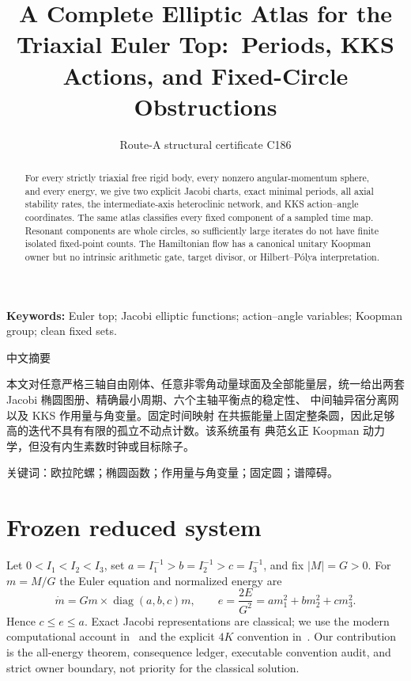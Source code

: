 \documentclass[8pt]{extarticle}
\title{A Complete Elliptic Atlas for the Triaxial Euler Top:\
Periods, KKS Actions, and Fixed-Circle Obstructions}
\author{Route-A structural certificate C186}
\date{}
\begin{document}
\maketitle
\begin{abstract}
For every strictly triaxial free rigid body, every nonzero angular-momentum
sphere, and every energy, we give two explicit Jacobi charts, exact minimal
periods, all axial stability rates, the intermediate-axis heteroclinic
network, and KKS action--angle coordinates.  The same atlas classifies every
fixed component of a sampled time map.  Resonant components are whole
circles, so sufficiently large iterates do not have finite isolated
fixed-point counts.  The Hamiltonian flow has a canonical unitary Koopman
owner but no intrinsic arithmetic gate, target divisor, or Hilbert--Pólya
interpretation.
\end{abstract}
\noindent\textbf{Keywords:} Euler top; Jacobi elliptic functions; action--angle
variables; Koopman group; clean fixed sets.

\begin{otherlanguage}{chinese-simplified}
\begin{center}{\large 中文摘要}\end{center}
本文对任意严格三轴自由刚体、任意非零角动量球面及全部能量层，统一给出两套
\foreignlanguage{english}{Jacobi} 椭圆图册、精确最小周期、六个主轴平衡点的稳定性、
中间轴异宿分离网以及 \foreignlanguage{english}{KKS} 作用量与角变量。固定时间映射
在共振能量上固定整条圆，因此足够高的迭代不具有有限的孤立不动点计数。该系统虽有
典范幺正 \foreignlanguage{english}{Koopman} 动力学，但没有内生素数时钟或目标除子。

\noindent 关键词：欧拉陀螺；椭圆函数；作用量与角变量；固定圆；谱障碍。
\end{otherlanguage}

\section{Frozen reduced system}
Let $0<I_1<I_2<I_3$, set
$a=I_1^{-1}>b=I_2^{-1}>c=I_3^{-1}$, and fix $|M|=G>0$.
For $m=M/G$ the Euler equation and normalized energy are
\begin{equation}
 \dot m=Gm\times\operatorname{diag}(a,b,c)m,
 \qquad e=\frac{2E}{G^2}=am_1^2+bm_2^2+cm_3^2.       \tag{1}
\end{equation}
Hence $c\le e\le a$.  Exact Jacobi representations are classical;
we use the modern computational account in~\cite{Celledoni2008} and the
explicit $4K$ convention in~\cite{Pina2015}.  Our contribution is the
all-energy theorem, consequence ledger, executable convention audit, and
strict owner boundary, not priority for the classical solution.
\end{document}
